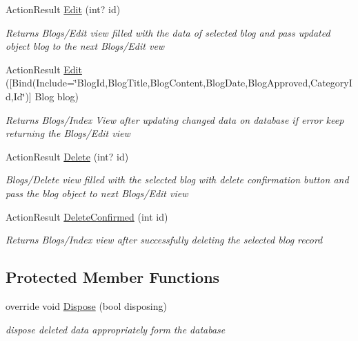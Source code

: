 \begin{DoxyCompactItemize}
Action\+Result \hyperlink{class_alfa_accounting_1_1_controllers_1_1_blogs_controller_ad761e1d2ccb29c9695488da4a14dac72}{Edit} (int? id)
\begin{DoxyCompactList}\small\item\em Returns Blogs/\+Edit view filled with the data of selected blog and pass updated object blog to the next Blogs/\+Edit vew \end{DoxyCompactList}\item 
Action\+Result \hyperlink{class_alfa_accounting_1_1_controllers_1_1_blogs_controller_a0eeae8f49493e7b482d2d682c56af91f}{Edit} (\mbox{[}Bind(Include=\char`\"{}Blog\+Id,Blog\+Title,Blog\+Content,Blog\+Date,Blog\+Approved,Category\+Id,Id\char`\"{})\mbox{]} Blog blog)
\begin{DoxyCompactList}\small\item\em Returns Blogs/\+Index View after updating changed data on database if error keep returning the Blogs/\+Edit view \end{DoxyCompactList}\item 
Action\+Result \hyperlink{class_alfa_accounting_1_1_controllers_1_1_blogs_controller_a9d3c0da54aa6522543eec25db0315d19}{Delete} (int? id)
\begin{DoxyCompactList}\small\item\em Blogs/\+Delete view filled with the selected blog with delete confirmation button and pass the blog object to next Blogs/\+Edit view \end{DoxyCompactList}\item 
Action\+Result \hyperlink{class_alfa_accounting_1_1_controllers_1_1_blogs_controller_a5a722765df3b6cea97c6e772d2fe55ec}{Delete\+Confirmed} (int id)
\begin{DoxyCompactList}\small\item\em Returns Blogs/\+Index view after successfully deleting the selected blog record \end{DoxyCompactList}\end{DoxyCompactItemize}
\subsection*{Protected Member Functions}
\begin{DoxyCompactItemize}
\item 
override void \hyperlink{class_alfa_accounting_1_1_controllers_1_1_blogs_controller_aaa6932bf904893e757eeafb0641772b2}{Dispose} (bool disposing)
\begin{DoxyCompactList}\small\item\em dispose deleted data appropriately form the database \end{DoxyCompactList}\end{DoxyCompactItemize}
